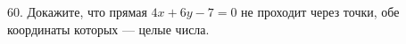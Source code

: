 60. Докажите, что прямая $4x+6y-7=0$ не проходит через точки, обе координаты которых --- целые числа.\\
